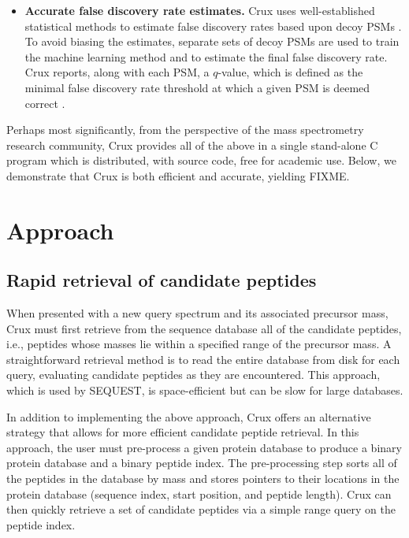 \documentclass{bioinfo}
\begin{document}
\begin{itemize}
\item {\bf Accurate false discovery rate estimates.}  Crux uses
  well-established statistical methods to estimate false discovery
  rates based upon decoy PSMs \cite{benjamini:controlling}.  To avoid
  biasing the estimates, separate sets of decoy PSMs are used to train
  the machine learning method and to estimate the final false
  discovery rate.  Crux reports, along with each PSM, a $q$-value,
  which is defined as the minimal false discovery rate threshold at
  which a given PSM is deemed correct \cite{storey:statistical}.

\end{itemize}

Perhaps most significantly, from the perspective of the mass
spectrometry research community, Crux provides all of the above in a
single stand-alone C program which is distributed, with source code,
free for academic use.  Below, we demonstrate that Crux is both
efficient and accurate, yielding FIXME.

\section{Approach}

\subsection{Rapid retrieval of candidate peptides}

When presented with a new query spectrum and its associated precursor
mass, Crux must first retrieve from the sequence database all of the
candidate peptides, i.e., peptides whose masses lie within a specified
range of the precursor mass.  A straightforward retrieval method is to
read the entire database from disk for each query, evaluating
candidate peptides as they are encountered.  This approach, which is
used by SEQUEST, is space-efficient but can be slow for large databases.

In addition to implementing the above approach, Crux offers an alternative
strategy that allows for more efficient candidate peptide retrieval.
In this approach, the user must pre-process a given protein database
to produce a binary protein database and a binary peptide index.  The
pre-processing step sorts all of the peptides in the database by mass
and stores pointers to their locations in the protein database
(sequence index, start position, and peptide length).  Crux can then
quickly retrieve a set of candidate peptides via a simple range query
on the peptide index.
\end{document}
